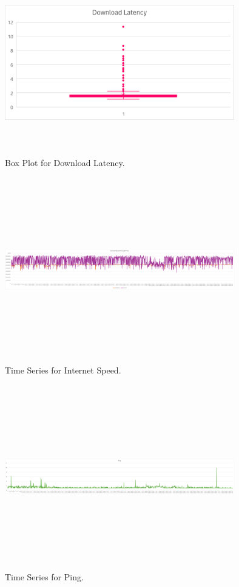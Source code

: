 \documentclass[conference]{IEEEtran}
\begin{document}
\begin{figure}[htbp]
    \centerline{\includegraphics[width=10cm,height=8cm,keepaspectratio]{Figures/Picture7.png}}
    \caption{Box Plot for Download Latency.}
    \label{fig7}
\end{figure}

\begin{figure}[htbp]
    \centerline{\includegraphics[width=10cm,height=8cm,keepaspectratio]{Figures/Picture17.png}}
    \caption{Time Series for Internet Speed.}
    \label{fig8}
\end{figure}

\begin{figure}[htbp]
    \centerline{\includegraphics[width=10cm,height=8cm,keepaspectratio]{Figures/Picture18.png}}
    \caption{Time Series for Ping.}
    \label{fig9}
\end{figure}
\end{document}
